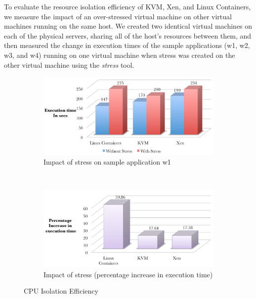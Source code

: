 To evaluate the resource isolation efficiency of KVM, Xen, and Linux Containers, we measure the impact of an over-stressed virtual machine on other virtual machines running on the same host. We created two identical virtual machines on each of the physical servers, sharing all of the host's resources between them, and then measured the change in execution times of the sample applications (w1, w2, w3, and w4) running on one virtual machine when stress was created on the other virtual machine using the \emph{stress} \cite{stress} tool.
\begin{figure}[H]
        \centering
        \begin{subfigure}[b]{0.99\textwidth}
                \includegraphics[width=\textwidth]{cpustress.png}
                \caption{Impact of stress on sample application w1}
                \label{fig:cpustress1}
        \end{subfigure}%
        ~ %
        \qquad \newline %
        \begin{subfigure}[b]{0.8\textwidth}
                \includegraphics[width=\textwidth]{cpustressp.png}
                \caption{Impact of stress (percentage increase in execution time)}
                \label{fig:cpustressp}
        \end{subfigure}
        \caption{CPU Isolation Efficiency}\label{fig:cpuisolation}
\end{figure}

